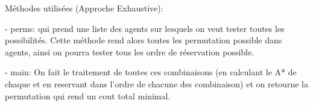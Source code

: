 \documentclass{article}
\begin{document}
Méthodes utilisées (Approche Exhaustive):

\noindent- perms: qui prend une liste des agents sur lesquels on veut tester toutes les possibilités. Cette méthode rend alors toutes les permutation possible dans agents, ainsi on pourra tester tous les ordre de réservation possible.

\noindent- main: On fait le traitement de toutes ces combinaisons (en calculant le A* de chaque et en reservant dans l'ordre de chacune des combinaison) et on retourne la permutation qui rend un cout total minimal.
\end{document}

